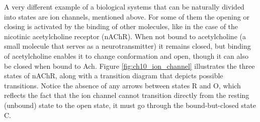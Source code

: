 \documentclass[
]{book}
\theoremstyle{definition}
\theoremstyle{definition}
\theoremstyle{definition}
\theoremstyle{remark}
\begin{document}
A very different example of a biological systems that can be naturally divided into states are ion channels, mentioned above. For some of them the opening or closing is activated by the binding of other molecules, like in the case of the nicotinic acetylcholine receptor (nAChR). When not bound to acetylcholine (a small molecule that serves as a neurotransmitter) it remains closed, but binding of acetylcholine enables it to change conformation and open, though it can also be closed when bound to Ach. Figure \ref{fig:ch10_ion_channel} illustrates the three states of nAChR, along with a transition diagram that depicts possible transitions. Notice the absence of any arrows between states R and O, which reflects the fact that the ion channel cannot transition directly from the resting (unbound) state to the open state, it must go through the bound-but-closed state C.
\end{document}
